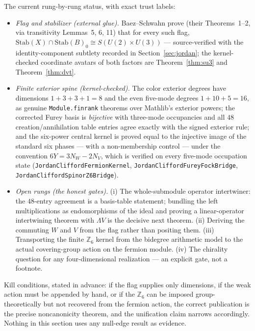 \documentclass[11pt]{article}
\newcommand{\leanname}[1]{\texttt{#1}}
\begin{document}
The current rung-by-rung status, with exact trust labels:

\begin{itemize}[leftmargin=2em]
\item \emph{Flag and stabilizer (external glue).}  Baez--Schwahn
  \cite{BaezSchwahn2026} prove (their Theorems~1--2, via transitivity
  Lemmas~5, 6, 11) that for every such flag,
  $\mathrm{Stab}(X)\cap\mathrm{Stab}(B)_0 \cong S(U(2)\times U(3))$ ---
  source-verified with the identity-component subtlety recorded in
  Section~\ref{sec:jordan}; the kernel-checked coordinate avatars of
  both factors are Theorem~\ref{thm:su3} and
  Theorem~\ref{thm:dvt}.
\item \emph{Finite exterior spine (kernel-checked).}  The color
  exterior degrees have dimensions $1+3+3+1=8$ and the even five-mode
  degrees $1+10+5=16$, as genuine \leanname{Module.finrank} theorems
  over Mathlib's exterior powers; the corrected Furey basis is
  \emph{bijective} with three-mode occupancies and all $48$
  creation/annihilation table entries agree exactly with the signed
  exterior rule; and the six-power central kernel is proved equal to
  the injective image of the standard six phases --- with a
  non-membership control --- under the convention $6Y=3N_W-2N_V$,
  which is verified on every five-mode occupation state
  (\leanname{JordanCliffordFermionKernel},
  \leanname{JordanCliffordFureyFockBridge},
  \leanname{JordanCliffordSpinorZ6Bridge}).
\item \emph{Open rungs (the honest gates).}  (i) The whole-submodule
  operator intertwiner: the $48$-entry agreement is a basis-table
  statement; bundling the left multiplications as endomorphisms of the
  ideal and proving a linear-operator intertwining theorem with
  $\Lambda V$ is the decisive next theorem.  (ii) Deriving the
  commuting $W$ and $V$ from the flag rather than positing them.
  (iii) Transporting the finite $\mathbb{Z}_6$ kernel from the
  bidegree arithmetic model to the actual covering-group action on the
  fermion module.  (iv) The chirality question for any
  four-dimensional realization --- an explicit gate, not a footnote.
\end{itemize}

Kill conditions, stated in advance: if the flag supplies only
dimensions, if the weak action must be appended by hand, or if the
$\mathbb{Z}_6$ can be imposed group-theoretically but not recovered
from the fermion action, the correct publication is the precise
noncanonicity theorem, and the unification claim narrows accordingly.
Nothing in this section uses any null-edge result as evidence.
\end{document}
